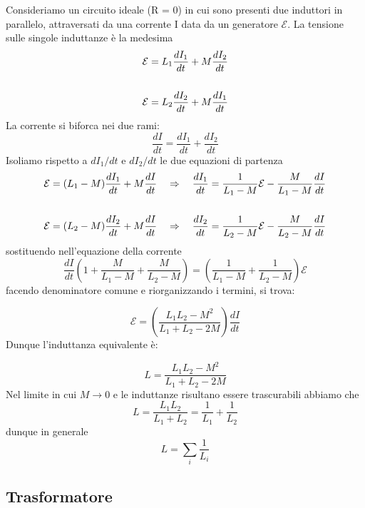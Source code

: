 Consideriamo un circuito ideale (R = 0) in cui sono presenti due induttori in parallelo, attraversati da una corrente I data da un generatore $\mathcal{E}$.  La tensione sulle singole induttanze \`e la medesima 
\begin{align*}
	\mathcal{E} = L_1 \frac{d I_1}{dt} + M \frac{dI_2}{dt} \\ \rule{0pt}{30pt} 
	\mathcal{E} = L_2 \frac{d I_2}{dt} + M \frac{d I_1}{dt}
\end{align*}
La corrente si biforca nei due rami: 
\begin{equation*}
	\frac{dI}{dt} = \frac{d I_1}{dt} + \frac{dI_2}{dt}
\end{equation*}
Isoliamo rispetto a $dI_1/dt$ e $dI_2/dt$ le due equazioni di partenza
\begin{align*}
	\mathcal{E}  = (L_1 -M) \frac{d I_1}{dt} + M \frac{d I}{dt} \quad \Rightarrow \quad \frac{d I_1}{dt} = \frac{1}{L_1-M} \mathcal{E} - \frac{M}{L_1-M} \frac{d I}{dt} \\ \rule{0pt}{30pt}
	\mathcal{E}  = (L_2 - M) \frac{d I_2}{dt} + M\frac{dI}{dt} \quad \Rightarrow \quad \frac{dI_2}{dt} = \frac{1}{L_2 - M} \mathcal{E} - \frac{M}{L_2 - M} \frac{d I}{dt}
\end{align*}
sostituendo nell'equazione della corrente 
\begin{equation*}
	\frac{dI}{dt} \left( 1 + \frac{M}{L_1 - M} + \frac{M}{L_2 -M}\right) = \left( \frac{1}{L_1 - M} + \frac{1}{L_2-M} \right)\mathcal{E}
\end{equation*}
facendo denominatore comune e riorganizzando i termini, si trova:

\begin{equation*}
	\mathcal{E} = \left( \frac{L_1L_2 - M^2}{L_1 + L_2 - 2M}\right)\frac{dI}{dt}
\end{equation*}
Dunque l'induttanza equivalente \`e:

\begin{equation}
	L = \frac{L_1 L_2 - M^2}{L_1 + L_2 -2M}
\end{equation}
Nel limite in cui $M \to 0$ e le induttanze risultano essere trascurabili abbiamo che 
\begin{equation*}
	L = \frac{L_1L_2}{L_1 + L_2} = \frac{1}{L_1} + \frac{1}{L_2}
\end{equation*}
dunque in generale 
\begin{equation}
	L = \sum_i \frac{1}{L_i}
\end{equation}

\subsection{Trasformatore}

